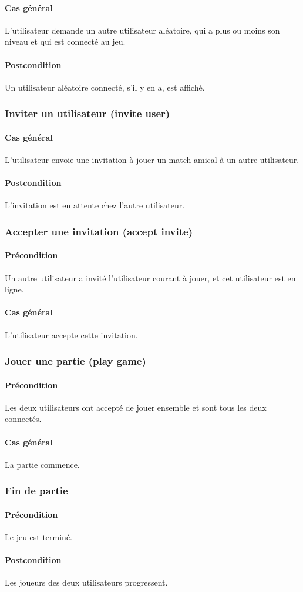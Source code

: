 \paragraph{Cas général} L'utilisateur demande un autre utilisateur aléatoire, qui a plus ou moins son niveau et qui est connecté au jeu.
\paragraph{Postcondition} Un utilisateur aléatoire connecté, s'il y en a, est affiché.

\subsubsection{Inviter un utilisateur (invite user)}

\paragraph{Cas général} L'utilisateur envoie une invitation à jouer un match amical à un autre utilisateur.
\paragraph{Postcondition} L'invitation est en attente chez l'autre utilisateur.

\subsubsection{Accepter une invitation (accept invite)}

\paragraph{Précondition} Un autre utilisateur a invité l'utilisateur courant à jouer, et cet utilisateur est en ligne.
\paragraph{Cas général} L'utilisateur accepte cette invitation.

\subsubsection{Jouer une partie (play game)}

\paragraph{Précondition} Les deux utilisateurs ont accepté de jouer ensemble et sont tous les deux connectés.
\paragraph{Cas général} La partie commence.

\subsubsection{Fin de partie}

\paragraph{Précondition} Le jeu est terminé.
\paragraph{Postcondition} Les joueurs des deux utilisateurs progressent.
